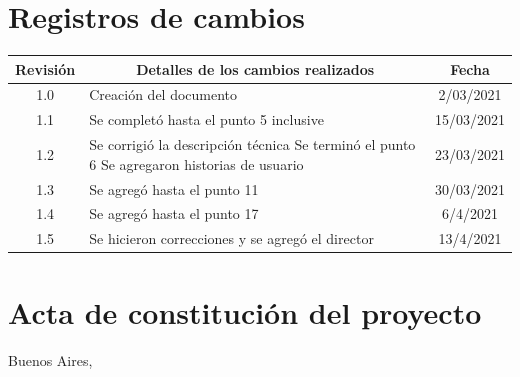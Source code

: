 \documentclass[11pt]{charter}
\begin{document}
\maketitle
\thispagestyle{empty}
\pagebreak


\thispagestyle{empty}
{\setlength{\parskip}{0pt}
\tableofcontents{}
}
\pagebreak


\section{Registros de cambios}
\label{sec:registro}


\begin{table}[ht]
\label{tab:registro}
\centering
\begin{tabularx}{\linewidth}{@{}|c|X|c|@{}}
\hline
\rowcolor[HTML]{C0C0C0} 
Revisión & \multicolumn{1}{c|}{\cellcolor[HTML]{C0C0C0}Detalles de los cambios realizados} & Fecha      \\ \hline
1.0      & Creación del documento                                          & 2/03/2021 \\ \hline
1.1      & Se completó hasta el punto 5 inclusive & 15/03/2021 \\ \hline
1.2      & Se corrigió la descripción técnica\newline
           Se terminó el punto 6\newline
           Se agregaron historias de usuario & 23/03/2021 \\ \hline
1.3      & Se agregó hasta el punto 11      & 30/03/2021  \\ \hline
1.4     & Se agregó hasta el punto 17       & 6/4/2021 \\ \hline
1.5     & Se hicieron correcciones y se agregó el director       & 13/4/2021 \\ \hline
\end{tabularx}
\end{table}

\pagebreak



\section{Acta de constitución del proyecto}
\label{sec:acta}

\begin{flushright}
Buenos Aires, \fechaInicioName
\end{flushright}

\vspace{2cm}
\end{document}
